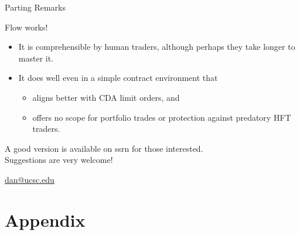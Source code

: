 \documentclass[10pt]{beamer}
\begin{document}
\begin{frame}{Parting Remarks}

Flow works!
\begin{itemize}
    \item It is comprehensible by human traders, although perhaps they take longer to master it.
    \item It does well even in a simple contract environment that
\begin{itemize}
    \item aligns better with CDA limit orders, and
    \item offers no scope for portfolio trades or protection against predatory HFT traders.
\end{itemize}
\end{itemize}


\vspace{.4in}

\begin{center}
{\large A good version is available on ssrn for those interested. \\ Suggestions are very welcome!}

\url{dan@ucsc.edu}
    
\end{center}


\end{frame}








\section{Appendix}




\end{document}
